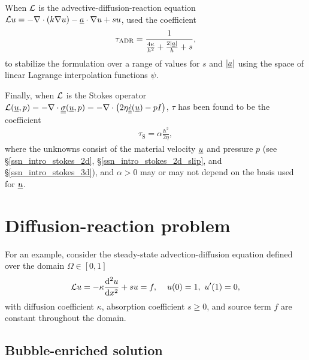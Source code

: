 When $\mathcal{L}$ is the advective-diffusion-reaction equation $\mathcal{L} u = - \nabla \cdot \left( k \nabla u \right) - \underline{a} \cdot \nabla u + s u$, \citet{codina_1992} used the coefficient
\begin{align}
  \label{tau_adr}
  \tau_{\text{ADR}} = \frac{1}{\frac{4 \kappa}{h^2} + \frac{2 |\underline{a}|}{h} + s},
\end{align}
to stabilize the formulation over a range of values for $s$ and $|\underline{a}|$ using the space of linear Lagrange interpolation functions $\psi$.

Finally, when $\mathcal{L}$ is the Stokes operator $\mathcal{L} (\underline{u},p) = -\nabla \cdot \underline{\underline{\sigma}}(\underline{u},p) = -\nabla \cdot \left( 2\eta\underline{\underline{\dot{\epsilon}}}(\underline{u}) - pI \right)$, $\tau$ has been found to be the coefficient \citep{hughes_1986}
\begin{align}
  \label{tau_stokes}
  \tau_{\text{S}} = \alpha \frac{h^2}{2\eta},
\end{align}
where the unknowns consist of the material velocity $\underline{u}$ and pressure $p$ (see \S \ref{ssn_intro_stokes_2d}, \S \ref{ssn_intro_stokes_2d_slip}, and \S \ref{ssn_intro_stokes_3d}), and $\alpha > 0$ may or may not depend on the basis used for $\underline{u}$.



\section{Diffusion-reaction problem}

For an example, consider the steady-state advection-diffusion equation defined over the domain $\Omega \in [0,1]$
\begin{align}
  \label{bubble_example_1}
  \Lu u = - \kappa \totder[2]{u}{x} + s u = f, \hspace{4mm} u(0) = 1,\ u'(1) = 0,
\end{align}
with diffusion coefficient $\kappa$, absorption coefficient $s \geq 0$, and source term $f$ are constant throughout the domain.

\subsection{Bubble-enriched solution}

